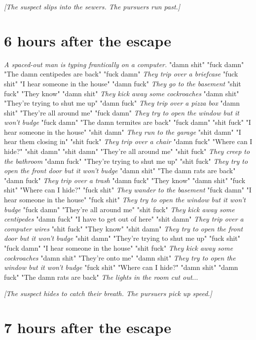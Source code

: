 \documentclass{report}
\begin{document}
\textit{[The suspect slips into the sewers. The pursuers run past.]}


\section*{6 \small{hours after the escape}}

\textit{A spaced-out man is typing frantically on a computer.} "damn shit" \textit{} "fuck damn" "The damn centipedes are back" "fuck damn" \textit{They trip over a briefcase} "fuck shit" "I hear someone in the house" "damn fuck" \textit{They go to the basement} "shit fuck" "They know" "damn shit" \textit{They kick away some cockroaches} "damn shit" "They're trying to shut me up" "damn fuck" \textit{They trip over a pizza box} "damn shit" "They're all around me" "fuck damn" \textit{They try to open the window but it won't budge} "fuck damn" "The damn termites are back" "fuck damn" \textit{} "shit fuck" "I hear someone in the house" "shit damn" \textit{They run to the garage} "shit damn" "I hear them closing in" "shit fuck" \textit{They trip over a chair} "damn fuck" "Where can I hide?" "shit damn" \textit{} "shit damn" "They're all around me" "shit fuck" \textit{They creep to the bathroom} "damn fuck" "They're trying to shut me up" "shit fuck" \textit{They try to open the front door but it won't budge} "damn shit" "The damn rats are back" "damn fuck" \textit{They trip over a trash} "damn fuck" "They know" "damn shit" \textit{} "fuck shit" "Where can I hide?" "fuck shit" \textit{They wander to the basement} "fuck damn" "I hear someone in the house" "fuck shit" \textit{They try to open the window but it won't budge} "fuck damn" "They're all around me" "shit fuck" \textit{They kick away some centipedes} "damn fuck" "I have to get out of here" "shit damn" \textit{They trip over a computer wires} "shit fuck" "They know" "shit damn" \textit{They try to open the front door but it won't budge} "shit damn" "They're trying to shut me up" "fuck shit" \textit{} "fuck damn" "I hear someone in the house" "shit fuck" \textit{They kick away some cockroaches} "damn shit" "They're onto me" "damn shit" \textit{They try to open the window but it won't budge} "fuck shit" "Where can I hide?" "damn shit" \textit{} "damn fuck" "The damn rats are back" \textit{The lights in the room cut out}...

\textit{[The suspect hides to catch their breath. The pursuers pick up speed.]}


\section*{7 \small{hours after the escape}}
\end{document}
